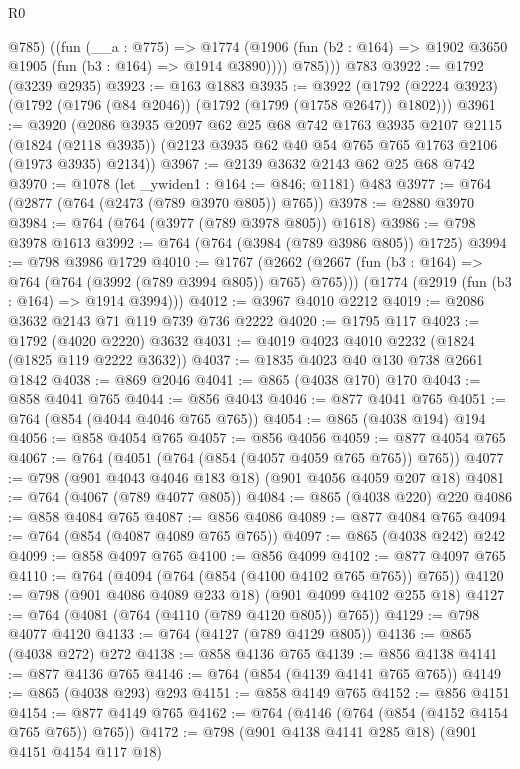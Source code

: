 \begin{lexlean}{R0}
\begin{coremodule}
{{{{{          @785)
        ((fun (__a : @775) =>
        @1774 (@1906 (fun (b2 : @164) => @1902 @3650 @1905 (fun (b3 : @164) => @1914 @3890))))
          @785)))
    @783
@3922 := @1792 (@3239 @2935)
@3923 := @163 @1883
@3935 := @3922 (@1792 (@2224 @3923) (@1792 (@1796 (@84 @2046)) (@1792 (@1799 (@1758 @2647)) @1802)))
@3961 := @3920
    (@2086
      @3935
      @2097
      @62
      @25
      @68
      @742
      @1763
      @3935
      @2107
      @2115
      (@1824 (@2118 @3935))
      (@2123 @3935 @62 @40 @54 @765 @765 @1763 @2106 (@1973 @3935) @2134))
@3967 := @2139 @3632 @2143 @62 @25 @68 @742
@3970 := @1078 (let _ywiden1 : @164 := @846; @1181) @483
@3977 := @764 (@2877 (@764 (@2473 (@789 @3970 @805)) @765))
@3978 := @2880 @3970
@3984 := @764 (@764 (@3977 (@789 @3978 @805)) @1618)
@3986 := @798 @3978 @1613
@3992 := @764 (@764 (@3984 (@789 @3986 @805)) @1725)
@3994 := @798 @3986 @1729
@4010 := @1767
    (@2662 (@2667 (fun (b3 : @164) => @764 (@764 (@3992 (@789 @3994 @805)) @765) @765)))
    (@1774 (@2919 (fun (b3 : @164) => @1914 @3994)))
@4012 := @3967 @4010 @2212
@4019 := @2086 @3632 @2143 @71 @119 @739 @736 @2222
@4020 := @1795 @117
@4023 := @1792 (@4020 @2220) @3632
@4031 := @4019 @4023 @4010 @2232 (@1824 (@1825 @119 @2222 @3632))
@4037 := @1835 @4023 @40 @130 @738 @2661 @1842
@4038 := @869 @2046
@4041 := @865 (@4038 @170) @170
@4043 := @858 @4041 @765
@4044 := @856 @4043
@4046 := @877 @4041 @765
@4051 := @764 (@854 (@4044 @4046 @765 @765))
@4054 := @865 (@4038 @194) @194
@4056 := @858 @4054 @765
@4057 := @856 @4056
@4059 := @877 @4054 @765
@4067 := @764 (@4051 (@764 (@854 (@4057 @4059 @765 @765)) @765))
@4077 := @798 (@901 @4043 @4046 @183 @18) (@901 @4056 @4059 @207 @18)
@4081 := @764 (@4067 (@789 @4077 @805))
@4084 := @865 (@4038 @220) @220
@4086 := @858 @4084 @765
@4087 := @856 @4086
@4089 := @877 @4084 @765
@4094 := @764 (@854 (@4087 @4089 @765 @765))
@4097 := @865 (@4038 @242) @242
@4099 := @858 @4097 @765
@4100 := @856 @4099
@4102 := @877 @4097 @765
@4110 := @764 (@4094 (@764 (@854 (@4100 @4102 @765 @765)) @765))
@4120 := @798 (@901 @4086 @4089 @233 @18) (@901 @4099 @4102 @255 @18)
@4127 := @764 (@4081 (@764 (@4110 (@789 @4120 @805)) @765))
@4129 := @798 @4077 @4120
@4133 := @764 (@4127 (@789 @4129 @805))
@4136 := @865 (@4038 @272) @272
@4138 := @858 @4136 @765
@4139 := @856 @4138
@4141 := @877 @4136 @765
@4146 := @764 (@854 (@4139 @4141 @765 @765))
@4149 := @865 (@4038 @293) @293
@4151 := @858 @4149 @765
@4152 := @856 @4151
@4154 := @877 @4149 @765
@4162 := @764 (@4146 (@764 (@854 (@4152 @4154 @765 @765)) @765))
@4172 := @798 (@901 @4138 @4141 @285 @18) (@901 @4151 @4154 @117 @18)
}}}}}
\end{coremodule}
\end{lexlean}
